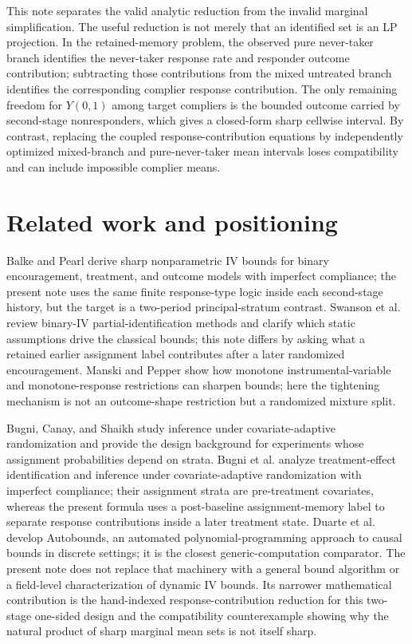 \documentclass[11pt]{article}
\theoremstyle{definition}
\theoremstyle{plain}
\theoremstyle{remark}
\begin{document}
This note separates the valid analytic reduction from the invalid marginal simplification.  The useful reduction is not merely that an identified set is an LP projection.  In the retained-memory problem, the observed pure never-taker branch identifies the never-taker response rate and responder outcome contribution; subtracting those contributions from the mixed untreated branch identifies the corresponding complier response contribution.  The only remaining freedom for \(Y(0,1)\) among target compliers is the bounded outcome carried by second-stage nonresponders, which gives a closed-form sharp cellwise interval.  By contrast, replacing the coupled response-contribution equations by independently optimized mixed-branch and pure-never-taker mean intervals loses compatibility and can include impossible complier means.

\section{Related work and positioning}
Balke and Pearl \cite{BalkePearl1997} derive sharp nonparametric IV bounds for binary encouragement, treatment, and outcome models with imperfect compliance; the present note uses the same finite response-type logic inside each second-stage history, but the target is a two-period principal-stratum contrast.  Swanson et al. \cite{SwansonHernanMillerRobinsRichardson2018} review binary-IV partial-identification methods and clarify which static assumptions drive the classical bounds; this note differs by asking what a retained earlier assignment label contributes after a later randomized encouragement.  Manski and Pepper \cite{ManskiPepper2000} show how monotone instrumental-variable and monotone-response restrictions can sharpen bounds; here the tightening mechanism is not an outcome-shape restriction but a randomized mixture split.

Bugni, Canay, and Shaikh \cite{BugniCanayShaikh2018} study inference under covariate-adaptive randomization and provide the design background for experiments whose assignment probabilities depend on strata.  Bugni et al. \cite{BugniGaoObradovicVelez2024} analyze treatment-effect identification and inference under covariate-adaptive randomization with imperfect compliance; their assignment strata are pre-treatment covariates, whereas the present formula uses a post-baseline assignment-memory label to separate response contributions inside a later treatment state.  Duarte et al. \cite{DuarteFinkelsteinKnoxMummoloShpitser2024} develop Autobounds, an automated polynomial-programming approach to causal bounds in discrete settings; it is the closest generic-computation comparator.  The present note does not replace that machinery with a general bound algorithm or a field-level characterization of dynamic IV bounds.  Its narrower mathematical contribution is the hand-indexed response-contribution reduction for this two-stage one-sided design and the compatibility counterexample showing why the natural product of sharp marginal mean sets is not itself sharp.
\end{document}
